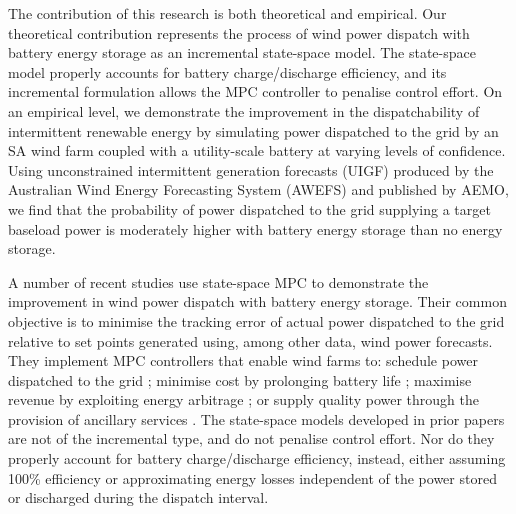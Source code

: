 \documentclass[3p,times,procedia]{elsarticle}
\begin{document}
The contribution of this research is both theoretical and empirical.  Our theoretical contribution represents the process of wind power dispatch with battery energy storage as an incremental state-space model.  The state-space model properly accounts for battery charge/discharge efficiency, and its incremental formulation allows the MPC controller to penalise control effort.  On an empirical level, we demonstrate the improvement in the dispatchability of intermittent renewable energy by simulating power dispatched to the grid by an SA wind farm coupled with a utility-scale battery at varying levels of confidence.  Using unconstrained intermittent generation forecasts (UIGF) produced by the Australian Wind Energy Forecasting System (AWEFS) and published by AEMO, we find that the probability of power dispatched to the grid supplying a target baseload power is moderately higher with battery energy storage than no energy storage.

A number of recent studies use state-space MPC to demonstrate the improvement in wind power dispatch with battery energy storage.  Their common objective is to minimise the tracking error of actual power dispatched to the grid relative to set points generated using, among other data, wind power forecasts.  They implement MPC controllers that enable wind farms to: schedule power dispatched to the grid \cite{HALBB14,TBBH10}; minimise cost by prolonging battery life \cite{KS10,YCTL12}; maximise revenue by exploiting energy arbitrage \cite{KKSA13}; or supply quality power through the provision of ancillary services \cite{YCTL14}.  The state-space models developed in prior papers are not of the incremental type, and do not penalise control effort.  Nor do they properly account for battery charge/discharge efficiency, instead, either assuming 100\% efficiency or approximating energy losses independent of the power stored or discharged during the dispatch interval.

\end{document}
